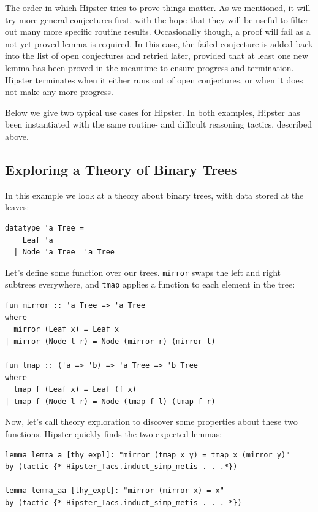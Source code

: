 The order in which Hipster tries to prove things matter. As we mentioned, it will try more general conjectures first, with the hope that they will be useful to filter out many more specific routine results. Occasionally though, a proof will fail as a not yet proved lemma is required. In this case, the failed conjecture is added back into the list of open conjectures and retried later, provided that at least one new lemma has been proved in the meantime to ensure progress and termination. Hipster terminates when it either runs out of open conjectures, or when it does not make any more progress. 

Below we give two typical use cases for Hipster. In both examples, Hipster has been instantiated with the  same routine- and difficult reasoning tactics, described above.

\subsection{Exploring a Theory of Binary Trees}
\label{sec:tree}
In this example we look at a theory about binary trees, with data stored at the leaves:
\begin{small}
\begin{verbatim}
datatype 'a Tree = 
    Leaf 'a 
  | Node 'a Tree  'a Tree
\end{verbatim}
\end{small}
Let's define some function over our trees. \texttt{mirror} swaps the left and right subtrees everywhere, and \texttt{tmap} applies a function to each element in the tree:
\begin{small}
\begin{verbatim}
fun mirror :: 'a Tree => 'a Tree
where
  mirror (Leaf x) = Leaf x
| mirror (Node l r) = Node (mirror r) (mirror l)

fun tmap :: ('a => 'b) => 'a Tree => 'b Tree
where
  tmap f (Leaf x) = Leaf (f x)
| tmap f (Node l r) = Node (tmap f l) (tmap f r) 
\end{verbatim} 
\end{small}
Now, let's call theory exploration to discover some properties about these two functions. Hipster quickly finds the two expected lemmas:  
\begin{small}
\begin{verbatim}
lemma lemma_a [thy_expl]: "mirror (tmap x y) = tmap x (mirror y)"
by (tactic {* Hipster_Tacs.induct_simp_metis . . .*})

lemma lemma_aa [thy_expl]: "mirror (mirror x) = x"
by (tactic {* Hipster_Tacs.induct_simp_metis . . . *})
\end{verbatim}
\end{small}
